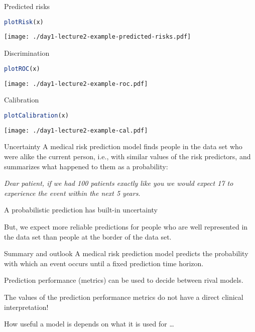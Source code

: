 \documentclass{beamer}\usepackage{listings}
\begin{document}
\begin{frame}[label={sec:org1df666c},fragile]{Predicted risks}
 \begin{lstlisting}[language=r,numbers=none]
plotRisk(x)
\end{lstlisting}

\begin{center}
\texttt{[image: ./day1-lecture2-example-predicted-risks.pdf]}
\end{center}
\end{frame}
\begin{frame}[label={sec:orge1d57e3},fragile]{Discrimination}
 \begin{lstlisting}[language=r,numbers=none]
plotROC(x)
\end{lstlisting}

\begin{center}
\texttt{[image: ./day1-lecture2-example-roc.pdf]}
\end{center}
\end{frame}
\begin{frame}[label={sec:orgbb1a64a},fragile]{Calibration}
 \begin{lstlisting}[language=r,numbers=none]
plotCalibration(x)
\end{lstlisting}

\begin{center}
\texttt{[image: ./day1-lecture2-example-cal.pdf]}
\end{center}
\end{frame}
\begin{frame}[label={sec:orga007d78}]{Uncertainty}
A medical risk prediction model finds people in the data set who were
alike the current person, i.e., with similar values of the risk
predictors, and summarizes what happened to them as a probability:
\vfill

\emph{Dear patient, if we had 100 patients exactly like you we would expect 17 to experience the event within the next 5 years}.
\vfill

A probabilistic prediction has built-in uncertainty
\vfill

But, we expect more reliable predictions for people who
are well represented in the data set than people at the border of the
data set.
\end{frame}
\begin{frame}[label={sec:org34bf30b}]{Summary and outlook}
A medical risk prediction model predicts the probability with which an
event occurs until a fixed prediction time horizon.
\vfill

Prediction performance (metrics) can be used to decide between rival models.

\vfill

The values of the prediction performance metrics do not have a direct
clinical interpretation! 

\vfill How useful a model is depends on what it is used for \dots{}
\end{frame}
\end{document}
